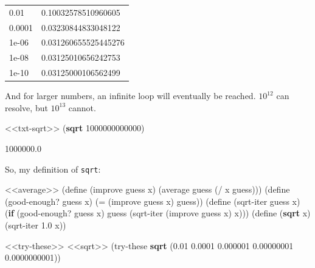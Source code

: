 \documentclass[
]{article}
\newenvironment{Shaded}{}{}
\newcommand{\DecValTok}[1]{\textcolor[rgb]{0.25,0.63,0.44}{#1}}
\newcommand{\ExtensionTok}[1]{#1}
\newcommand{\FloatTok}[1]{\textcolor[rgb]{0.25,0.63,0.44}{#1}}
\newcommand{\FunctionTok}[1]{\textcolor[rgb]{0.02,0.16,0.49}{#1}}
\newcommand{\KeywordTok}[1]{\textcolor[rgb]{0.00,0.44,0.13}{\textbf{#1}}}
\newcommand{\NormalTok}[1]{#1}
\newcommand{\OperatorTok}[1]{\textcolor[rgb]{0.40,0.40,0.40}{#1}}
\begin{document}
\begin{longtable}[]{@{}ll@{}}
\toprule
\endhead
0.01 & 0.10032578510960605 \\
0.0001 & 0.03230844833048122 \\
1e-06 & 0.031260655525445276 \\
1e-08 & 0.03125010656242753 \\
1e-10 & 0.03125000106562499 \\
\bottomrule
\end{longtable}

And for larger numbers, an infinite loop will eventually be reached.
\(10^{12}\) can resolve, but \(10^{13}\) cannot.

\begin{Shaded}
\begin{Highlighting}[numbers=left,,]
\NormalTok{\textless{}\textless{}txt{-}sqrt\textgreater{}\textgreater{}}
\NormalTok{(}\KeywordTok{sqrt} \DecValTok{1000000000000}\NormalTok{)}
\end{Highlighting}
\end{Shaded}

1000000.0

So, my definition of \texttt{sqrt}:

\hypertarget{sqrt}{%
\label{sqrt}}%
\begin{Shaded}
\begin{Highlighting}[numbers=left,,]
\NormalTok{\textless{}\textless{}average\textgreater{}\textgreater{}}
\NormalTok{(}\ExtensionTok{define}\FunctionTok{ }\NormalTok{(improve guess x)}
\NormalTok{  (average guess (}\OperatorTok{/}\NormalTok{ x guess)))}
\NormalTok{(}\ExtensionTok{define}\FunctionTok{ }\NormalTok{(good{-}enough? guess x)}
\NormalTok{   (}\OperatorTok{=}\NormalTok{ (improve guess x) guess))}
\NormalTok{(}\ExtensionTok{define}\FunctionTok{ }\NormalTok{(sqrt{-}iter guess x)}
\NormalTok{  (}\KeywordTok{if}\NormalTok{ (good{-}enough? guess x)}
\NormalTok{      guess}
\NormalTok{      (sqrt{-}iter (improve guess x) x)))}
\NormalTok{(}\ExtensionTok{define}\FunctionTok{ }\NormalTok{(}\KeywordTok{sqrt}\NormalTok{ x)}
\NormalTok{  (sqrt{-}iter }\FloatTok{1.0}\NormalTok{ x))}
\end{Highlighting}
\end{Shaded}

\hypertarget{EX1-7-t3}{%
\label{EX1-7-t3}}%
\begin{Shaded}
\begin{Highlighting}[numbers=left,,]
\NormalTok{\textless{}\textless{}try{-}these\textgreater{}\textgreater{}}
\NormalTok{\textless{}\textless{}sqrt\textgreater{}\textgreater{}}
\NormalTok{(try{-}these }\KeywordTok{sqrt}\NormalTok{ \textquotesingle{}(}\FloatTok{0.01} \FloatTok{0.0001} \FloatTok{0.000001} \FloatTok{0.00000001} \FloatTok{0.0000000001}\NormalTok{))}
\end{Highlighting}
\end{Shaded}
\end{document}
